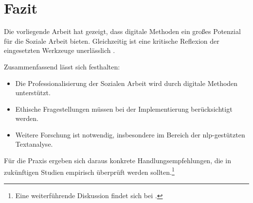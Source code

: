 \chapter{Fazit}
\label{ch:fazit}

Die vorliegende Arbeit hat gezeigt, dass digitale Methoden ein großes Potenzial für die Soziale Arbeit bieten. Gleichzeitig ist eine kritische Reflexion der eingesetzten Werkzeuge unerlässlich \parencite[vgl.][201]{mueller2020}.

Zusammenfassend lässt sich festhalten:

\begin{itemize}
    \item Die Professionalisierung der Sozialen Arbeit wird durch digitale Methoden unterstützt.
    \item Ethische Fragestellungen müssen bei der Implementierung berücksichtigt werden.
    \item Weitere Forschung ist notwendig, insbesondere im Bereich der \gls{nlp}-gestützten Textanalyse.
\end{itemize}

Für die Praxis ergeben sich daraus konkrete Handlungsempfehlungen, die in zukünftigen Studien empirisch überprüft werden sollten.\footnote{Eine weiterführende Diskussion findet sich bei \textcite{staub2018}.}

